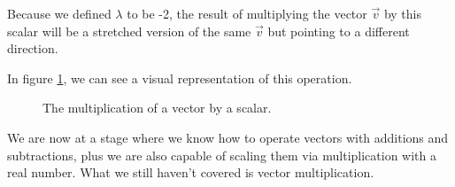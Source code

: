 \documentclass[a4,12pt,twosided,openany]{memoir}
\begin{document}
Because we defined $\lambda$ to be -2, the result of multiplying the vector $\overrightarrow{v}$ by this scalar will be a stretched version of the same $\overrightarrow{v}$ but pointing to a different direction.
\par 
\indent
In figure \ref{fig:vectorscalarexample}, we can see a visual representation of this operation.
\newpage
\begin{figure}[h!]
\begin{center}
\vspace*{13pt}
\caption{The multiplication of a vector by a scalar.}\label{fig:vectorscalarexample}
\end{center}
\end{figure}
\par 
\indent
We are now at a stage where we know how to operate vectors with additions and subtractions, plus we are also capable of scaling them via multiplication with a real number. What we still haven’t covered is vector multiplication.
\end{document}
